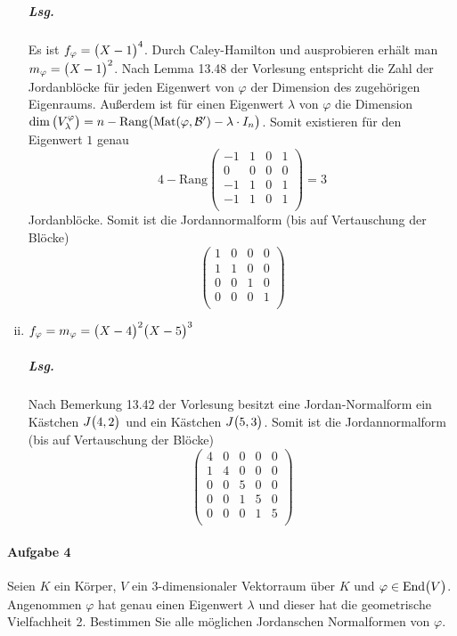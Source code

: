 \documentclass{scrreprt}
\newcommand\End{\text{End}}
\newcommand\Mat{\text{Mat}}
\newcommand\Rang{\text{Rang}}
\begin{document}
\begin{enumerate}[(i)]
  \subparagraph{Lsg.} Es ist $f_{\varphi} = \qty\big(X - 1)^4$.
  Durch Caley-Hamilton und ausprobieren erhält man
  $m_{\varphi} = \qty\big(X - 1)^2$.
  Nach Lemma 13.48 der Vorlesung entspricht die Zahl der Jordanblöcke für jeden
  Eigenwert von $\varphi$ der Dimension des zugehörigen Eigenraums.
  Außerdem ist für einen Eigenwert $\lambda$ von $\varphi$ die Dimension
  $\dim\qty\big(V_{\lambda}^{\varphi}) =
  n - \Rang\qty\big(\Mat(\varphi, \mathcal{B}') - \lambda \cdot I_n)$.
  Somit existieren für den Eigenwert $1$ genau
  \[
    4 - \Rang\begin{pmatrix}
      -1 & 1 & 0 & 1 \\
       0 & 0 & 0 & 0 \\
      -1 & 1 & 0 & 1 \\
      -1 & 1 & 0 & 1 \\
    \end{pmatrix} = 3
  \]
  Jordanblöcke.
  Somit ist die Jordannormalform (bis auf Vertauschung der Blöcke)
  \[
    \begin{pmatrix}
      1 & 0 & 0 & 0 \\
      1 & 1 & 0 & 0 \\
      0 & 0 & 1 & 0 \\
      0 & 0 & 0 & 1 \\
    \end{pmatrix}
  \]

\newpage
\item $f_{\varphi} = m_{\varphi} = \qty\big(X - 4)^2\qty\big(X - 5)^3$

  \subparagraph{Lsg.} Nach Bemerkung 13.42 der Vorlesung besitzt eine
  Jordan-Normalform ein Kästchen $J\qty\big(4, 2)$ und ein Kästchen
  $J\qty\big(5, 3)$.
  Somit ist die Jordannormalform (bis auf Vertauschung der Blöcke)
  \[
    \begin{pmatrix}
      4 & 0 & 0 & 0 & 0 \\
      1 & 4 & 0 & 0 & 0 \\
      0 & 0 & 5 & 0 & 0 \\
      0 & 0 & 1 & 5 & 0 \\
      0 & 0 & 0 & 1 & 5 \\
    \end{pmatrix}
  \]
\end{enumerate}

\paragraph{Aufgabe 4} Seien $K$ ein Körper, $V$ ein $3$-dimensionaler Vektorraum
über $K$ und $\varphi \in \End\qty\big(V)$.
Angenommen $\varphi$ hat genau einen Eigenwert $\lambda$ und dieser hat die
geometrische Vielfachheit 2.
Bestimmen Sie alle möglichen Jordanschen Normalformen von $\varphi$.
\end{document}
